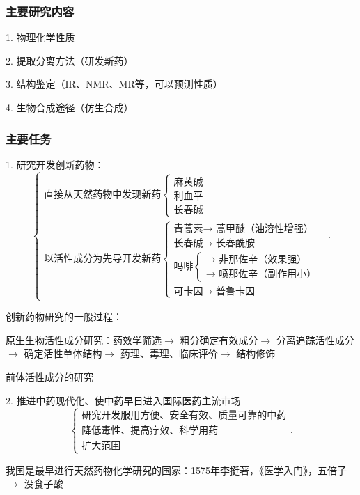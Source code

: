 \subsubsection*{主要研究内容}%
\label{subsub:主要研究内容}
1. 物理化学性质

2. 提取分离方法（研发新药）

3. 结构鉴定（IR、NMR、MR等，可以预测性质）

4. 生物合成途径（仿生合成）

\subsubsection*{主要任务}%
\label{subsub:主要任务}
1. 研究开发创新药物：
\[
    \begin{cases}
        \text{直接从天然药物中发现新药}\begin{cases}
            \text{麻黄碱}\\
            \text{利血平}\\
            \text{长春碱}
        \end{cases}\\
        \text{以活性成分为先导开发新药}\begin{cases}
            \text{青蒿素$\to $ 蒿甲醚（油溶性增强）}\\
            \text{长春碱$\to $ 长春酰胺}\\
            \text{吗啡}\begin{cases}
                \text{$\to $ 非那佐辛（效果强）}\\
                \text{$\to $ 喷那佐辛（副作用小）}
            \end{cases}\\
            \text{可卡因$\to $ 普鲁卡因}
        \end{cases}
    \end{cases}
.\] 
\begin{notation}
    创新药物研究的一般过程：

    原生生物活性成分研究：药效学筛选$\to $ 粗分确定有效成分$\to $ 分离追踪活性成分$\to $ 确定活性单体结构$\to $ 药理、毒理、临床评价$\to $ 结构修饰

    前体活性成分的研究
\end{notation}

2. 推进中药现代化、使中药早日进入国际医药主流市场
\[
    \begin{cases}
        \text{研究开发服用方便、安全有效、质量可靠的中药}\\
        \text{降低毒性、提高疗效、科学用药}\\
        \text{扩大范围}
    \end{cases}
.\] 
\begin{notation}
    我国是最早进行天然药物化学研究的国家：1575年李挺著，《医学入门》，五倍子$\to $ 没食子酸
\end{notation}

